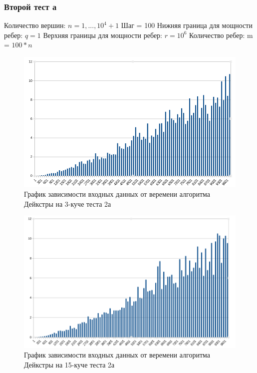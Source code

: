 \documentclass[a4paper, 12pt]{article}
\theoremstyle{definition}
\begin{document}
	\subsubsection{Второй тест а}
	Количество вершин: $n = 1, ... , 10^4+1$ \newline
	Шаг = 100 \newline
	Нижняя граница для мощности ребер: $q = 1$ \newline
	Верхняя границы для мощности ребер: $r = 10^6$ \newline
	Количество ребер: m = $100*n$ \newline
	
	\begin{figure}[!ht]
		\centering
		\includegraphics[width=1\textwidth]{img/res2a_3.png}
		\caption{График зависимости входных данных от веремени алгоритма Дейкстры на 3-куче теста 2а}
		\label{fig:my_image}
	\end{figure}
	
	\begin{figure}[!ht]
		\centering
		\includegraphics[width=1\textwidth]{img/res2a_15.png}
		\caption{График зависимости входных данных от веремени алгоритма Дейкстры на 15-куче теста 2а}
		\label{fig:my_image}
	\end{figure}
	
\end{document}
